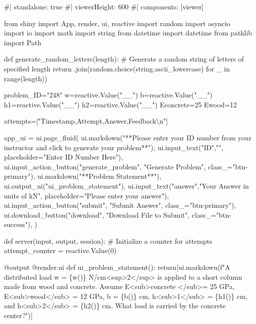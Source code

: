 \documentclass[
  letterpaper,
  DIV=11,
  numbers=noendperiod]{scrreprt}
\newenvironment{Shaded}{\begin{snugshade}}{\end{snugshade}}
\newcommand{\NormalTok}[1]{\textcolor[rgb]{0.00,0.23,0.31}{#1}}
\begin{document}
\begin{Shaded}
\begin{Highlighting}[]
\NormalTok{\#| standalone: true}
\NormalTok{\#| viewerHeight: 600}
\NormalTok{\#| components: [viewer]}

\NormalTok{from shiny import App, render, ui, reactive}
\NormalTok{import random}
\NormalTok{import asyncio}
\NormalTok{import io}
\NormalTok{import math}
\NormalTok{import string}
\NormalTok{from datetime import datetime}
\NormalTok{from pathlib import Path}

\NormalTok{def generate\_random\_letters(length):}
\NormalTok{    \# Generate a random string of letters of specified length}
\NormalTok{    return \textquotesingle{}\textquotesingle{}.join(random.choice(string.ascii\_lowercase) for \_ in range(length)) }

\NormalTok{problem\_ID="248"}
\NormalTok{w=reactive.Value("\_\_")}
\NormalTok{b=reactive.Value("\_\_")}
\NormalTok{h1=reactive.Value("\_\_")}
\NormalTok{h2=reactive.Value("\_\_")}
\NormalTok{Econcrete=25}
\NormalTok{Ewood=12}

\NormalTok{attempts=["Timestamp,Attempt,Answer,Feedback\textbackslash{}n"]}

\NormalTok{app\_ui = ui.page\_fluid(}
\NormalTok{    ui.markdown("**Please enter your ID number from your instructor and click to generate your problem**"),}
\NormalTok{    ui.input\_text("ID","", placeholder="Enter ID Number Here"),}
\NormalTok{    ui.input\_action\_button("generate\_problem", "Generate Problem", class\_="btn{-}primary"),}
\NormalTok{    ui.markdown("**Problem Statement**"),}
\NormalTok{    ui.output\_ui("ui\_problem\_statement"),}
\NormalTok{    ui.input\_text("answer","Your Answer in units of kN", placeholder="Please enter your answer"),}
\NormalTok{    ui.input\_action\_button("submit", "Submit Answer", class\_="btn{-}primary"),}
\NormalTok{    ui.download\_button("download", "Download File to Submit", class\_="btn{-}success"),}
\NormalTok{)}


\NormalTok{def server(input, output, session):}
\NormalTok{    \# Initialize a counter for attempts}
\NormalTok{    attempt\_counter = reactive.Value(0)}

\NormalTok{    @output}
\NormalTok{    @render.ui}
\NormalTok{    def ui\_problem\_statement():}
\NormalTok{        return[ui.markdown(f"A distributed load w = \{w()\} N/cm\textless{}sup\textgreater{}2\textless{}/sup\textgreater{} is applied to a short column made from wood and concrete. Assume E\textless{}sub\textgreater{}concrete \textless{}/sub\textgreater{}= 25 GPa, E\textless{}sub\textgreater{}wood\textless{}/sub\textgreater{} = 12 GPa, b = \{b()\} cm, h\textless{}sub\textgreater{}1\textless{}/sub\textgreater{} = \{h1()\} cm, and h\textless{}sub\textgreater{}2\textless{}/sub\textgreater{} = \{h2()\} cm. What load is carried by the concrete center?")]}
    

\end{Highlighting}
\end{Shaded}
\end{document}
